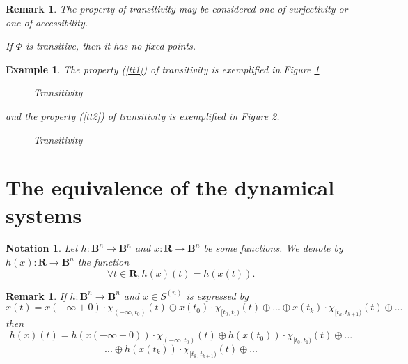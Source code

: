 \documentclass[12pt]{article}\usepackage{amsmath}
\newtheorem{example}[theorem]{Example}
\newtheorem{notation}[theorem]{Notation}
\newtheorem{remark}[theorem]{Remark}
\begin{document}
\begin{remark}
The property of transitivity may be considered one of surjectivity or one of accessibility.

If $\Phi$ is transitive, then it has no fixed points.
\end{remark}

\begin{example}
The property (\ref{tt1}) of transitivity is exemplified in Figure
\ref{minimality1}
\begin{figure}
[ptb]
\begin{center}
\caption{Transitivity}\label{minimality1}\end{center}
\end{figure}
and the property (\ref{tt2}) of transitivity is exemplified in Figure
\ref{minimality2}.
\begin{figure}
[ptb]
\begin{center}
\caption{Transitivity}\label{minimality2}\end{center}
\end{figure}

\end{example}

\section{The equivalence of the dynamical systems}

\begin{notation}
Let $h:\mathbf{B}^{n}\rightarrow\mathbf{B}^{n}$ and $x:\mathbf{R}\rightarrow\mathbf{B}^{n}$ be some functions. We denote by $h(x):\mathbf{R}\rightarrow\mathbf{B}^{n}$ the function\[
\forall t\in\mathbf{R},h(x)(t)=h(x(t)).
\]

\end{notation}

\begin{remark}
If $h:\mathbf{B}^{n}\rightarrow\mathbf{B}^{n}$ and $x\in S^{(n)}$ is expressed
by\[
x(t)=x(-\infty+0)\cdot\chi_{(-\infty,t_{0})}(t)\oplus x(t_{0})\cdot
\chi_{\lbrack t_{0},t_{1})}(t)\oplus...\oplus x(t_{k})\cdot\chi_{\lbrack
t_{k},t_{k+1})}(t)\oplus...
\]
then\[
h(x)(t)=h(x(-\infty+0))\cdot\chi_{(-\infty,t_{0})}(t)\oplus h(x(t_{0}))\cdot\chi_{\lbrack t_{0},t_{1})}(t)\oplus...
\]\[
...\oplus h(x(t_{k}))\cdot\chi_{\lbrack t_{k},t_{k+1})}(t)\oplus...
\]

\end{remark}
\end{document}
